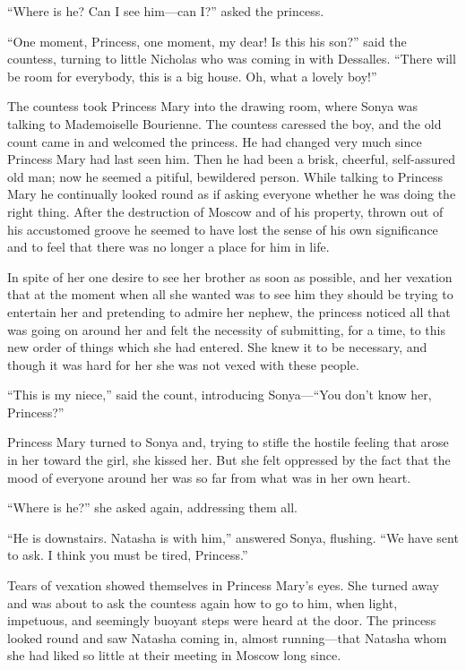 ``Where is he? Can I see him---can I?'' asked the princess.

``One moment, Princess, one moment, my dear! Is this his son?''
said the countess, turning to little Nicholas who was coming in
with Dessalles.  ``There will be room for everybody, this is a
big house. Oh, what a lovely boy!''

The countess took Princess Mary into the drawing room, where
Sonya was talking to Mademoiselle Bourienne. The countess
caressed the boy, and the old count came in and welcomed the
princess. He had changed very much since Princess Mary had last
seen him. Then he had been a brisk, cheerful, self-assured old
man; now he seemed a pitiful, bewildered person. While talking to
Princess Mary he continually looked round as if asking everyone
whether he was doing the right thing. After the destruction of
Moscow and of his property, thrown out of his accustomed groove
he seemed to have lost the sense of his own significance and to
feel that there was no longer a place for him in life.

In spite of her one desire to see her brother as soon as
possible, and her vexation that at the moment when all she wanted
was to see him they should be trying to entertain her and
pretending to admire her nephew, the princess noticed all that
was going on around her and felt the necessity of submitting, for
a time, to this new order of things which she had entered. She
knew it to be necessary, and though it was hard for her she was
not vexed with these people.

``This is my niece,'' said the count, introducing Sonya---``You
don't know her, Princess?''

Princess Mary turned to Sonya and, trying to stifle the hostile
feeling that arose in her toward the girl, she kissed her. But
she felt oppressed by the fact that the mood of everyone around
her was so far from what was in her own heart.

``Where is he?'' she asked again, addressing them all.

``He is downstairs. Natasha is with him,'' answered Sonya,
flushing. ``We have sent to ask. I think you must be tired,
Princess.''

Tears of vexation showed themselves in Princess Mary's eyes. She
turned away and was about to ask the countess again how to go to
him, when light, impetuous, and seemingly buoyant steps were
heard at the door.  The princess looked round and saw Natasha
coming in, almost running---that Natasha whom she had liked so
little at their meeting in Moscow long since.

